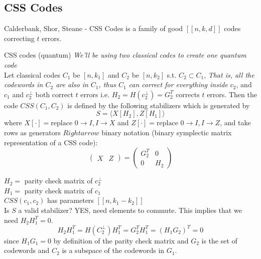 \subsection{CSS Codes}
Calderbank, Shor, Steane - CSS Codes is a family of good $[[n,k,d]]$ codes correcting $t$ errors. 
\begin{definition}
    CSS codes (quantum) \textit{We'll be using two classical codes to create one quantum code}\\ 
    Let classical codes $C_1$ be $[n,k_1]$ and $C_2$ be $[n,k_2]$ s.t. $C_2 \subset C_1$, \textit{That is, all the codewords in $C_2$ are also in $C_1$, thus $C_1$ can correct for everything inside $c_2$}, and $c_1$ and $c_2^\perp$ both correct $t$ errors i.e. $H_2 = H(c_2^\perp) = G_2^T$ corrects $t$ errors. Then the code $CSS(C_1,C_2)$ is defined by the following stabilizers which is generated by 
    \begin{equation}
        S = \langle X[H_2], Z[H_1] \rangle 
    \end{equation}
    where $X[\cdot] = \text{replace } 0 \rightarrow I, I\rightarrow X$ and $Z[\cdot] = \text{replace } 0 \rightarrow I, I\rightarrow Z$, and take rows as generators $Rightarrow$ binary notation (binary symplectic matrix representation of a CSS code): 
    \begin{equation}
        \left(\begin{array}{c|c} X & Z \end{array}\right)= \left(\begin{array}{c|c} G_2^{T} & 0\\ \hline 0 & H_2 \end{array}\right)
    \end{equation}
\end{definition} 
$H_2 =$ parity check matrix of $c_2^\perp$ \\ 
$H_1 =$ parity check matrix of $c_1$ \\
$CSS(c_1,c_2)$ has parameters $[[n,k_1-k_2]]$ \\
Is $S$ a valid stabilizer? YES, need elements to commute. This implies that we need $H_2H_1^T = 0$. \\
\begin{equation}
     H_2H_1^T = H(C_2^\perp)H_1^T = G_2^TH_1^T = (H_1G_2)^T = 0
\end{equation}
since $H_1G_1 = 0$ by definition of the parity check matrix and $G_2$ is the set of codewords and $C_2$ is a subspace of the codewords in $G_1$. \\

